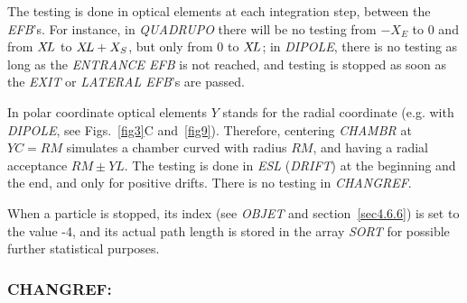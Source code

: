 \noindent The testing is done in optical elements at each integration step, between the
\textsl{EFB}'s. For instance, in \textsl{QUADRUPO} there will be 
no testing from $-X_E $ to 0 and 
from $ X\!L $ to $ X\!L+X_S $, but only from 0  to $ X\!L $;  in \textsl{DIPOLE}, there is no 
testing as long as the \textsl{ENTRANCE EFB} is not reached, and testing is stopped as 
soon as the \textsl{EXIT} or \textsl{LATERAL EFB}'s are passed.  
\bigskip

\noindent In polar coordinate optical elements $ Y $  stands for the radial
coordinate (e.g. with \textsl{DIPOLE}, see Figs.~\ref{fig3}C and~\ref{fig9}).  
 Therefore, centering \textsl{CHAMBR} at $ YC=RM $ simulates a chamber curved with radius 
 $ RM $, and having a radial acceptance $ RM\pm YL $.  The testing  is done in  \textsl{ESL}  
 (\textsl{DRIFT}) at the beginning and the end, and only for positive drifts.  There 
is no testing in \textsl{CHANGREF}.  
\bigskip

\noindent When a particle is stopped, its index 
\IEX{}  (see \textsl{OBJET} and 
section~\ref{sec4.6.6}) is set to the value -4, and its actual path length is stored in the array 
\textsl{SORT} for possible further statistical purposes. 




\newpage

\subsubsection*{CHANGREF: \CHANGREFTitl} \label{CHANGREF}
\medskip

